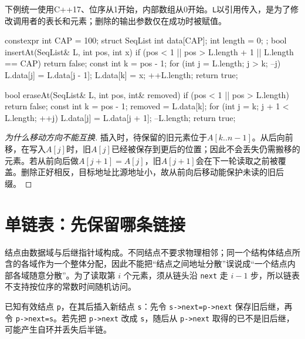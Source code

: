 下例统一使用C++17、位序从1开始，内部数组从0开始。\texttt{L}以引用传入，是为了修改调用者的表长和元素；删除的输出参数仅在成功时被赋值。

\begin{codeblock}[language=C++]
constexpr int CAP = 100;
struct SeqList { int data[CAP]; int length = 0; };
bool insertAt(SeqList& L, int pos, int x) {
    if (pos < 1 || pos > L.length + 1 || L.length == CAP)
        return false;
    const int k = pos - 1;
    for (int j = L.length; j > k; --j)
        L.data[j] = L.data[j - 1];
    L.data[k] = x;
    ++L.length;
    return true;
}
\end{codeblock}

\begin{codeblock}[language=C++]
bool eraseAt(SeqList& L, int pos, int& removed) {
    if (pos < 1 || pos > L.length) return false;
    const int k = pos - 1;
    removed = L.data[k];
    for (int j = k; j + 1 < L.length; ++j)
        L.data[j] = L.data[j + 1];
    --L.length;
    return true;
}
\end{codeblock}

\begin{proof}[为什么移动方向不能互换]

插入时，待保留的旧元素位于\(A[k..n-1]\)。从后向前移，在写入\(A[j]\)时，旧\(A[j]\)已经被保存到更后的位置；因此不会丢失仍需搬移的元素。若从前向后做\(A[j+1]=A[j]\)，旧\(A[j+1]\)会在下一轮读取之前被覆盖。删除正好相反，目标地址比源地址小，故从前向后移动能保护未读的旧后缀。

\end{proof}

\section{单链表：先保留哪条链接}\label{DS02-03}

结点由数据域与后继指针域构成。不同结点不要求物理相邻；同一个结构体结点所含的各域作为一个整体分配，因此不能把``结点之间地址分散''误说成``一个结点内部各域随意分散''。为了读取第 \(i\) 个元素，须从链头沿 \texttt{next} 走 \(i-1\) 步，所以链表不支持按位序的常数时间随机访问。

已知有效结点 \texttt{p}，在其后插入新结点 \texttt{s}：先令 \texttt{s->\allowbreak{}next=\allowbreak{}p->\allowbreak{}next} 保存旧后继，再令 \texttt{p->\allowbreak{}next=\allowbreak{}s}。若先把 \texttt{p->\allowbreak{}next} 改成 \texttt{s}，随后从 \texttt{p->\allowbreak{}next} 取得的已不是旧后继，可能产生自环并丢失后半链。

